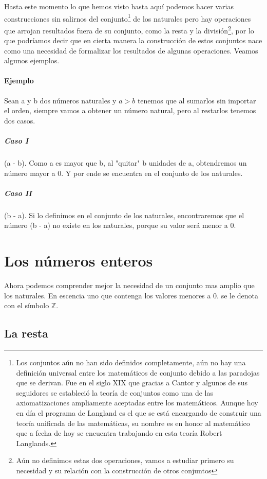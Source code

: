 \documentclass{article}
\begin{document}
Hasta este momento lo que hemos visto hasta aquí podemos hacer varias construcciones sin salirnos del conjunto\footnote{Los conjuntos aún no han sido definidos completamente, aún no hay una definición universal entre los matemáticos de conjunto debido a las paradojas que se derivan. Fue en el siglo XIX que gracias a Cantor y algunos de sus seguidores se estableció la teoría de conjuntos como una de las axiomatizaciones ampliamente aceptadas entre los matemáticos. Aunque hoy en día el programa de Langland es el que se está encargando de construir una teoría unificada de las matemáticas, su nombre es en honor al matemático que a fecha de hoy se encuentra trabajando en esta teoría Robert Langlands.} de los naturales pero hay operaciones que arrojan resultados fuera de su conjunto, como la resta y la división\footnote{Aún no definimos estas dos operaciones, vamos a estudiar primero su necesidad y su relación con la construcción de otros conjuntos}, por lo que podríamos decir que en cierta manera la construcción de estos conjuntos nace como una necesidad de formalizar los resultados de algunas operaciones. Veamos algunos ejemplos.

\paragraph{Ejemplo} Sean a y b dos números naturales y $a > b$ tenemos que al sumarlos sin importar el orden, siempre vamos a obtener un número natural, pero al restarlos tenemos dos casos.

\subparagraph{Caso I} (a - b). Como a es mayor que b, al "quitar" b unidades de a, obtendremos un número mayor a 0. Y por ende se encuentra en el conjunto de los naturales.

\subparagraph{Caso II} (b - a). Si lo definimos en el conjunto de los naturales, encontraremos que el número (b - a) no existe en los naturales, porque su valor será menor a 0.

\section{Los números enteros}

Ahora podemos comprender mejor la necesidad de un conjunto mas amplio que los naturales. En escencia uno que contenga los valores menores a 0. se le denota con el símbolo $\mathbb{Z}$.

\subsection{La resta}
\end{document}

